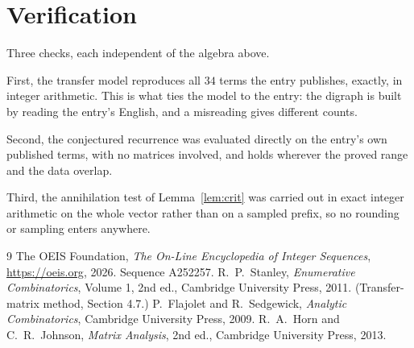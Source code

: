 \documentclass[11pt,a4paper]{article}
\theoremstyle{plain}
\theoremstyle{definition}
\begin{document}
\section{Verification}

Three checks, each independent of the algebra above.

First, the transfer model reproduces all $34$ terms the entry publishes, exactly, in
integer arithmetic. This is what ties the model to the entry: the digraph is built by reading
the entry's English, and a misreading gives different counts.

Second, the conjectured recurrence was evaluated directly on the entry's own published terms,
with no matrices involved, and holds wherever the proved range and the data overlap.

Third, the annihilation test of Lemma~\ref{lem:crit} was carried out in exact integer
arithmetic on the whole vector rather than on a sampled prefix, so no rounding or sampling
enters anywhere.

\begin{thebibliography}{9}
 The OEIS Foundation, \emph{The On-Line Encyclopedia of Integer
Sequences}, \url{https://oeis.org}, 2026. Sequence A252257.
 R.~P.~Stanley, \emph{Enumerative Combinatorics}, Volume 1, 2nd ed.,
Cambridge University Press, 2011. (Transfer-matrix method, Section 4.7.)
 P.~Flajolet and R.~Sedgewick, \emph{Analytic Combinatorics}, Cambridge
University Press, 2009.
 R.~A.~Horn and C.~R.~Johnson, \emph{Matrix Analysis}, 2nd ed., Cambridge
University Press, 2013.
\end{thebibliography}
\end{document}
